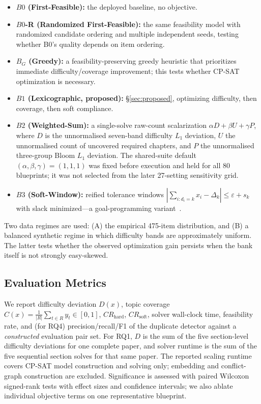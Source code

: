 \documentclass[runningheads]{llncs}
\begin{document}
\begin{itemize}
    \item \textbf{$B0$ (First-Feasible):} the deployed baseline, no objective.
    \item \textbf{$B0$-R (Randomized First-Feasible):} the same feasibility model with randomized candidate ordering and multiple independent seeds, testing whether B0's quality depends on item ordering.
    \item \textbf{$B_G$ (Greedy):} a feasibility-preserving greedy heuristic that prioritizes immediate difficulty/coverage improvement; this tests whether CP-SAT optimization is necessary.
    \item \textbf{$B1$ (Lexicographic, proposed):} \S\ref{sec:proposed}, optimizing difficulty, then coverage, then soft compliance.
    \item \textbf{$B2$ (Weighted-Sum):} a single-solve raw-count scalarization $\alpha D+\beta U+\gamma P$, where $D$ is the unnormalised seven-band difficulty $L_1$ deviation, $U$ the unnormalised count of uncovered required chapters, and $P$ the unnormalised three-group Bloom $L_1$ deviation.
The shared-suite default $(\alpha,\beta,\gamma)=(1,1,1)$ was fixed before execution and held for all 80 blueprints;
it was not selected from the later 27-setting sensitivity grid.
    \item \textbf{$B3$ (Soft-Window):} reified tolerance windows $|\sum_{i:d_i=k}x_i-\Delta_k|\le\varepsilon+s_k$ with slack minimized---a goal-programming variant~\cite{ignizio1976}.
\end{itemize}

Two data regimes are used: (A) the empirical 475-item distribution, and (B) a balanced synthetic regime in which difficulty bands are approximately uniform.
The latter tests whether the observed optimization gain persists when the bank itself is not strongly easy-skewed.

\subsection{Evaluation Metrics}
We report difficulty deviation $D(x)$, topic coverage $C(x)=\frac{1}{|R|}\sum_{t\in R} y_t\in[0,1]$, $CR_{\mathrm{hard}}$, $CR_{\mathrm{soft}}$, solver wall-clock time, feasibility rate, and (for RQ4) precision/recall/F1 of the duplicate detector against a \emph{constructed} evaluation pair set.
For RQ1, $D$ is the sum of the five section-level difficulty deviations for one complete paper, and solver runtime is the sum of the five sequential section solves for that same paper.
The reported scaling runtime covers CP-SAT model construction and solving only; embedding and conflict-graph construction are excluded.
Significance is assessed with paired Wilcoxon signed-rank tests with effect sizes and confidence intervals;
we also ablate individual objective terms on one representative blueprint.
\end{document}

